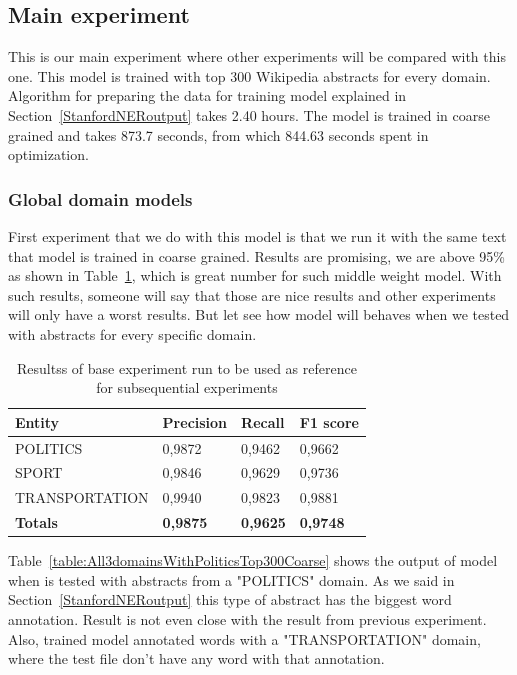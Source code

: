 \documentclass[thesis=M,english]{FITthesis}[2018/05/30]
\begin{document}
\subsection{Main experiment}\label{MainExperiment}
	This is our main experiment where other experiments will be compared with this one. This model is trained with top 300 Wikipedia abstracts for every domain. Algorithm for preparing the data for training model explained in Section~\ref{StanfordNERoutput} takes 2.40 hours. The model is trained in coarse grained and takes 873.7 seconds, from which 844.63 seconds spent in optimization.

\subsubsection{Global domain models}
	First experiment that we do with this model is that we run it with the same text that model is trained in coarse grained. Results are promising, we are above 95\% as shown in Table~\ref{table:All3domainsWithAll3DomiansTop300Coarse}, which is great number for such middle weight model. With such results, someone will say that those are nice results and other experiments will only have a worst results. But let see how model will behaves when we tested with abstracts for every specific domain.

	\begin{table}[H]\centering
		\begin{tabular}{|l|l|l|l|}
			\hline {\textbf{Entity}} & {\textbf{Precision}} & {\textbf{Recall}} & {\textbf{F1 score}}\\\hline
				POLITICS & 0,9872 & 0,9462 & 0,9662\\
				SPORT & 0,9846 & 0,9629 & 0,9736\\
				TRANSPORTATION & 0,9940 & 0,9823 & 0,9881\\\hline
				\textbf{Totals} & \textbf{0,9875} & \textbf{0,9625} & \textbf{0,9748}\\\hline
		\end{tabular}
		\caption{Resultss of base experiment run to be used as reference for subsequential experiments \label{table:All3domainsWithAll3DomiansTop300Coarse}}
	\end{table}	
	
	Table~\ref{table:All3domainsWithPoliticsTop300Coarse} shows the output of model when is tested with abstracts from a "POLITICS" domain. As we said in Section~\ref{StanfordNERoutput} this type of abstract has the biggest word annotation. Result is not even close with the result from previous experiment. Also, trained model annotated words with a "TRANSPORTATION" domain, where the test file don't have any word with that annotation. 
	
\end{document}
